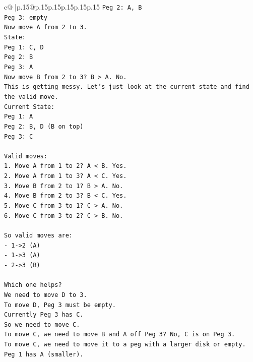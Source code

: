 \documentclass{article}
\begin{document}
{\begin{supertabular}{c@{$\;$}|p{.15\linewidth}@{}p{.15\linewidth}p{.15\linewidth}p{.15\linewidth}p{.15\linewidth}p{.15\linewidth}}
{{{\texttt{Peg 2: A, B} \\
\texttt{Peg 3: empty} \\
\texttt{Now move A from 2 to 3.} \\
\texttt{State:} \\
\texttt{Peg 1: C, D} \\
\texttt{Peg 2: B} \\
\texttt{Peg 3: A} \\
\texttt{Now move B from 2 to 3? B > A. No.} \\
\texttt{This is getting messy. Let's just look at the current state and find the valid move.} \\
\texttt{Current State:} \\
\texttt{Peg 1: A} \\
\texttt{Peg 2: B, D (B on top)} \\
\texttt{Peg 3: C} \\
\\ 
\texttt{Valid moves:} \\
\texttt{1. Move A from 1 to 2? A < B. Yes.} \\
\texttt{2. Move A from 1 to 3? A < C. Yes.} \\
\texttt{3. Move B from 2 to 1? B > A. No.} \\
\texttt{4. Move B from 2 to 3? B < C. Yes.} \\
\texttt{5. Move C from 3 to 1? C > A. No.} \\
\texttt{6. Move C from 3 to 2? C > B. No.} \\
\\ 
\texttt{So valid moves are:} \\
\texttt{{-} 1{-}>2 (A)} \\
\texttt{{-} 1{-}>3 (A)} \\
\texttt{{-} 2{-}>3 (B)} \\
\\ 
\texttt{Which one helps?} \\
\texttt{We need to move D to 3.} \\
\texttt{To move D, Peg 3 must be empty.} \\
\texttt{Currently Peg 3 has C.} \\
\texttt{So we need to move C.} \\
\texttt{To move C, we need to move B and A off Peg 3? No, C is on Peg 3.} \\
\texttt{To move C, we need to move it to a peg with a larger disk or empty.} \\
\texttt{Peg 1 has A (smaller).} \\
}}}
\end{supertabular}}
\end{document}
